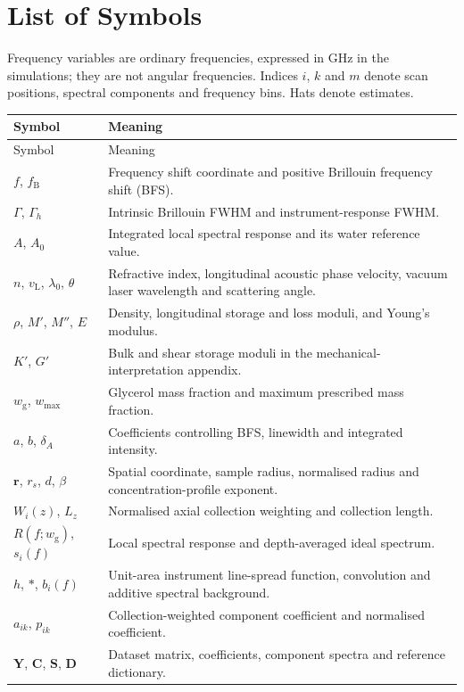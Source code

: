 \documentclass[11pt]{article}
\newcommand{\wg}{w_{\mathrm g}}
\newcommand{\wmax}{w_{\max}}
\begin{document}
\section*{List of Symbols}
Frequency variables are ordinary frequencies, expressed in GHz in the simulations; they are not angular frequencies. Indices $i$, $k$ and $m$ denote scan positions, spectral components and frequency bins. Hats denote estimates.
\small
\begin{longtable}{@{}p{}p{}@{}}
\toprule Symbol & Meaning \\ \midrule\endfirsthead
\toprule Symbol & Meaning \\ \midrule\endhead
$f$, $f_{\mathrm B}$ & Frequency shift coordinate and positive Brillouin frequency shift (BFS). \\
$\Gamma$, $\Gamma_h$ & Intrinsic Brillouin FWHM and instrument-response FWHM. \\
$A$, $A_0$ & Integrated local spectral response and its water reference value. \\
$n$, $v_{\mathrm L}$, $\lambda_0$, $\theta$ & Refractive index, longitudinal acoustic phase velocity, vacuum laser wavelength and scattering angle. \\
$\rho$, $M'$, $M''$, $E$ & Density, longitudinal storage and loss moduli, and Young's modulus. \\
$K'$, $G'$ & Bulk and shear storage moduli in the mechanical-interpretation appendix. \\
$\wg$, $\wmax$ & Glycerol mass fraction and maximum prescribed mass fraction. \\
$a$, $b$, $\delta_A$ & Coefficients controlling BFS, linewidth and integrated intensity. \\
$\mathbf r$, $r_s$, $d$, $\beta$ & Spatial coordinate, sample radius, normalised radius and concentration-profile exponent. \\
$W_i(z)$, $L_z$ & Normalised axial collection weighting and collection length. \\
$R(f;\wg)$, $s_i(f)$ & Local spectral response and depth-averaged ideal spectrum. \\
$h$, $*$, $b_i(f)$ & Unit-area instrument line-spread function, convolution and additive spectral background. \\
$a_{ik}$, $p_{ik}$ & Collection-weighted component coefficient and normalised coefficient. \\
$\mathbf Y$, $\mathbf C$, $\mathbf S$, $\mathbf D$ & Dataset matrix, coefficients, component spectra and reference dictionary. \\

\end{longtable}
\end{document}
